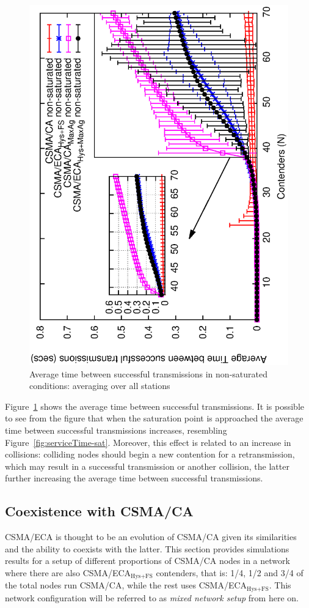 \documentclass[a4paper,journal]{IEEEtran}
\begin{document}
	\begin{figure}[tb]
		\centering
		\includegraphics[width=0.7\linewidth,angle=-90]{figures/unsaturated/timeBetweenSxTx-unsat/timeBetweenSxTx-multiplot-unsat2.eps}
		\caption{Average time between successful transmissions in non-saturated conditions: averaging over all stations}
		\label{fig:timeBetweenSxTx-multiplot-unsat}
	\end{figure}	
	
	Figure~\ref{fig:timeBetweenSxTx-multiplot-unsat} shows the average time between successful transmissions. It is possible to see from the figure that when the saturation point is approached the average time between successful transmissions increases, resembling Figure~\ref{fig:serviceTime-sat}. Moreover, this effect is related to an increase in collisions: colliding nodes should begin a new contention for a retransmission, which may result in a successful transmission or another collision, the latter further increasing the average time between successful transmissions.
	
	\subsection{Coexistence with CSMA/CA}\label{coexistance-w-csmaca}
	
	CSMA/ECA is thought to be an evolution of CSMA/CA given its similarities and the ability to coexists with the latter. This section provides simulations results for a setup of different proportions of CSMA/CA nodes in a network where there are also CSMA/ECA$_{\text{Hys+FS}}$ contenders, that is: 1/4, 1/2 and 3/4 of the total nodes run CSMA/CA, while the rest uses CSMA/ECA$_{\text{Hys+FS}}$. This network configuration will be referred to as \emph{mixed network setup} from here on.	
\end{document}
